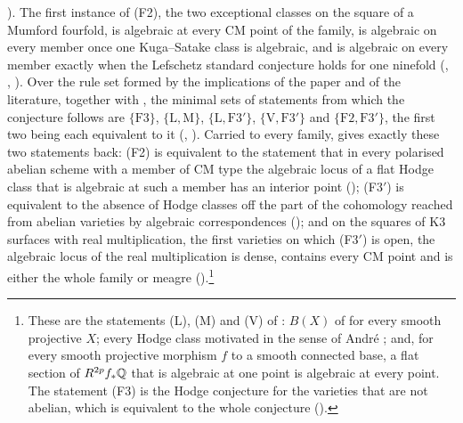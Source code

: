\begin{theorem}[Closure]
\begin{enumerate}[label=\textup{(\roman*)},leftmargin=2.8em,itemsep=4pt]
  ). The first instance of
  \textup{(F2)}, the two exceptional classes on the square of a Mumford
  fourfold, is algebraic at every CM point of the family, is algebraic on
  every member once one Kuga--Satake class is algebraic, and is algebraic on
  every member exactly when the Lefschetz standard conjecture holds for one
  ninefold (, ,
  ). Over the rule set formed by the implications of
  the paper and of the literature, together with , the
  minimal sets of statements from which the conjecture follows are
  $\{\mathrm{F3}\}$, $\{\mathrm{L},\mathrm{M}\}$,
  $\{\mathrm{L},\mathrm{F3}'\}$, $\{\mathrm{V},\mathrm{F3}'\}$ and
  $\{\mathrm{F2},\mathrm{F3}'\}$, the first two being each equivalent to it
  (, ). Carried to every family,
   gives exactly these two statements back:
  \textup{(F2)} is equivalent to the statement that in every polarised
  abelian scheme with a member of CM type the algebraic locus of a flat
  Hodge class that is algebraic at such a member has an interior point
  (); \textup{(F3$'$)} is equivalent to the absence
  of Hodge classes off the part of the cohomology reached from abelian
  varieties by algebraic correspondences (); and on the
  squares of K3 surfaces with real multiplication, the first varieties on
  which \textup{(F3$'$)} is open, the algebraic locus of the real
  multiplication is dense, contains every CM point and is either the whole
  family or meagre ().\footnote{These are the statements
  \textup{(L)}, \textup{(M)} and \textup{(V)} of : $B(X)$ of
   for every smooth projective $X$; every Hodge class
  motivated in the sense of Andr\'e \cite[\S2.1]{And96b}; and, for every
  smooth projective morphism $f$ to a smooth connected base, a flat section of
  $R^{2p}f_{*}\mathbb{Q}$ that is algebraic at one point is algebraic at every
  point. The statement (F3) is the Hodge conjecture for the varieties that
  are not abelian, which is equivalent to the whole conjecture
  ().}
\end{enumerate}
\end{theorem}

